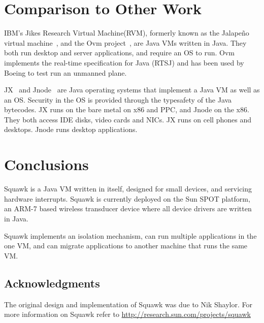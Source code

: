 \documentclass{sig-alt-sun}
\begin{document}
\section{Comparison to Other Work}

IBM's Jikes Research Virtual Machine(RVM), formerly known as
the Jalape\~{n}o virtual machine~\cite{Alpe99}, and the 
Ovm project~\cite{Pala03}, are Java VMs written in Java. 
They both run desktop and server applications, and require an OS to run.  
Ovm implements the real-time specification for Java (RTSJ) and
has been used by Boeing to test run an unmanned plane. 

JX~\cite{Golm02} and Jnode~\cite{Lohm05} are Java operating 
systems that implement a Java VM as well as an OS.  Security 
in the OS is provided through the typesafety of the Java bytecodes. 
JX runs on the bare metal on x86 and PPC, and Jnode on the x86.
They both access IDE disks, video cards and NICs.
JX runs on cell phones and desktops.  
Jnode runs desktop applications.

\section{Conclusions}
Squawk is a Java VM written in itself, designed for small devices, 
and servicing hardware interrupts.
Squawk is currently deployed on the Sun SPOT platform, an 
ARM-7 based wireless transducer device where all device 
drivers are written in Java.

Squawk implements an isolation mechanism, can run multiple 
applications in the one VM, and can migrate applications 
to another machine that runs the same VM. 

\subsection*{Acknowledgments}
The original design and implementation of Squawk was
due to Nik Shaylor.
For more information on Squawk refer to 
\url{http://research.sun.com/projects/squawk}




\end{document}
